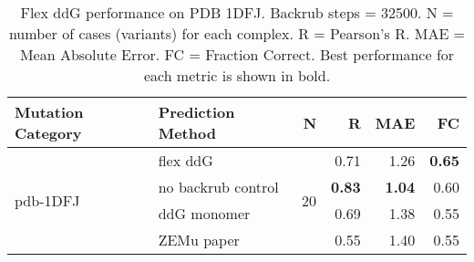 \begin{table}
  \begin{tabular}{llrrrr}
\toprule
Mutation Category &   Prediction Method &   N &    R &  MAE &   FC \\
\midrule
 \multirow{ 4}{*}{pdb-1DFJ} & flex ddG & \multirow{ 4}{*}{20} & 0.71 & 1.26 & \textbf{0.65}  \\
 & no backrub control & & \textbf{0.83} & \textbf{1.04} & 0.60  \\
 & ddG monomer & & 0.69 & 1.38 & 0.55  \\
 & ZEMu paper & & 0.55 & 1.40 & 0.55  \\
\bottomrule
\end{tabular}
  \caption[Flex ddG performance on PDB 1DFJ]{
    Flex ddG performance on PDB 1DFJ. Backrub steps = 32500. N = number of cases (variants) for each complex. R = Pearson's R. MAE = Mean Absolute Error. FC = Fraction Correct. Best performance for each metric is shown in bold.
  } \label{tab:table-pdb-1DFJ}
\end{table}
